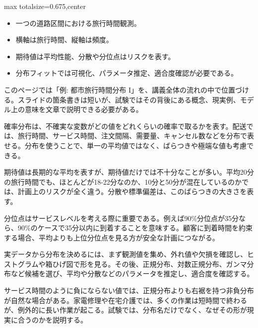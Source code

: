 \clearpage
{}
\begin{adjustbox}{max totalsize={\textwidth}{0.675\textheight},center}
\begin{minipage}{\textwidth}\scriptsize
\begin{minipage}[t]{0.485\textwidth}
\begin{itemize}
\item 一つの道路区間における旅行時間観測。
\item 横軸は旅行時間、縦軸は頻度。
\end{itemize}
\begin{itemize}
\item 期待値は平均性能、分散や分位点はリスクを表す。
\item 分布フィットでは可視化、パラメータ推定、適合度確認が必要である。
\end{itemize}
\end{minipage}\hfill
\begin{minipage}[t]{0.485\textwidth}
このページでは「例: 都市旅行時間分布 I」を、講義全体の流れの中で位置づける。スライドの箇条書きは短いが、試験ではその背後にある概念、現実例、モデル上の意味を文章で説明できる必要がある。\par
確率分布は、不確実な変数がどの値をどれくらいの確率で取るかを表す。配送では、旅行時間、サービス時間、注文間隔、需要量、キャンセル数などを分布で表せる。分布を使うことで、単一の平均値ではなく、ばらつきや極端な値も考慮できる。\par
期待値は長期的な平均を表すが、期待値だけでは不十分なことが多い。平均20分の旅行時間でも、ほとんどが18-22分なのか、10分と50分が混在しているのかでは、計画上のリスクが全く違う。分散や標準偏差は、このばらつきの大きさを表す。\par
分位点はサービスレベルを考える際に重要である。例えば90\%分位点が35分なら、90\%のケースで35分以内に到着することを意味する。顧客に到着時間を約束する場合、平均よりも上位分位点を見る方が安全な計画につながる。\par
実データから分布を決めるには、まず観測値を集め、外れ値や欠損を確認し、ヒストグラムや箱ひげ図で形を見る。その後、正規分布、対数正規分布、ガンマ分布など候補を選び、平均や分散などのパラメータを推定し、適合度を確認する。\par
サービス時間のように負にならない値では、正規分布よりも右裾を持つ非負分布が自然な場合がある。家電修理や在宅介護では、多くの作業は短時間で終わるが、例外的に長い作業が起こる。試験では、分布名だけでなく、なぜその形が現実に合うのかを説明する。\par

\end{minipage}
\end{minipage}
\end{adjustbox}

